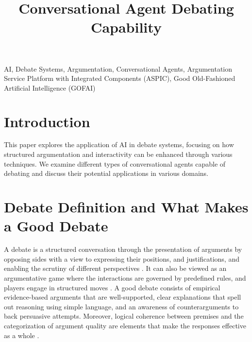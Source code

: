 \documentclass[conference]{IEEEtran}
\begin{document}
\title{Conversational Agent Debating Capability}

\author{
\and
{}
}

\maketitle

\begin{abstract}

\end{abstract}

\begin{IEEEkeywords}
AI, Debate Systems, Argumentation, Conversational Agents, Argumentation Service Platform with Integrated Components (ASPIC), Good Old-Fashioned Artificial Intelligence (GOFAI)
\end{IEEEkeywords}

\section{Introduction}
This paper explores the application of AI in debate systems, focusing on how structured argumentation and interactivity can be enhanced through various techniques. We examine different types of conversational agents capable of debating and discuss their potential applications in various domains.

\section{Debate Definition and What Makes a Good Debate}
A debate is a structured conversation through the presentation of arguments by opposing sides with a view to expressing their positions, and justifications, and enabling the scrutiny of different perspectives \cite{b1}\cite{b2}. It can also be viewed as an argumentative game where the interactions are governed by predefined rules, and players engage in structured moves \cite{b6}. A good debate consists of empirical evidence-based arguments that are well-supported, clear explanations that spell out reasoning using simple language, and an awareness of counterarguments to back persuasive attempts. Moreover, logical coherence between premises and the categorization of argument quality are elements that make the responses effective as a whole \cite{b6}.
\end{document}
